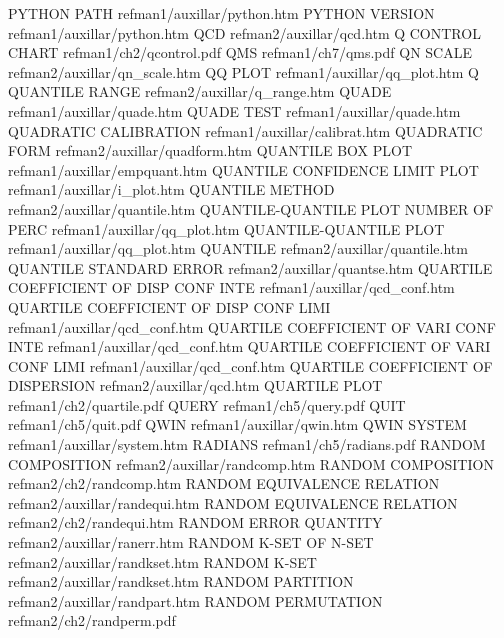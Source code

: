 PYTHON PATH                             refman1/auxillar/python.htm
PYTHON VERSION                          refman1/auxillar/python.htm
QCD                                     refman2/auxillar/qcd.htm
Q CONTROL CHART                         refman1/ch2/qcontrol.pdf
QMS                                     refman1/ch7/qms.pdf
QN SCALE                                refman2/auxillar/qn_scale.htm
QQ PLOT                                 refman1/auxillar/qq_plot.htm
Q QUANTILE RANGE                        refman2/auxillar/q_range.htm
QUADE                                   refman1/auxillar/quade.htm
QUADE TEST                              refman1/auxillar/quade.htm
QUADRATIC CALIBRATION                   refman1/auxillar/calibrat.htm
QUADRATIC FORM                          refman2/auxillar/quadform.htm
QUANTILE BOX PLOT                       refman1/auxillar/empquant.htm
QUANTILE CONFIDENCE LIMIT PLOT          refman1/auxillar/i_plot.htm
QUANTILE METHOD                         refman2/auxillar/quantile.htm
QUANTILE-QUANTILE PLOT NUMBER OF PERC   refman1/auxillar/qq_plot.htm
QUANTILE-QUANTILE PLOT                  refman1/auxillar/qq_plot.htm
QUANTILE                                refman2/auxillar/quantile.htm
QUANTILE STANDARD ERROR                 refman2/auxillar/quantse.htm
QUARTILE COEFFICIENT OF DISP CONF INTE  refman1/auxillar/qcd_conf.htm
QUARTILE COEFFICIENT OF DISP CONF LIMI  refman1/auxillar/qcd_conf.htm
QUARTILE COEFFICIENT OF VARI CONF INTE  refman1/auxillar/qcd_conf.htm
QUARTILE COEFFICIENT OF VARI CONF LIMI  refman1/auxillar/qcd_conf.htm
QUARTILE COEFFICIENT OF DISPERSION      refman2/auxillar/qcd.htm
QUARTILE PLOT                           refman1/ch2/quartile.pdf
QUERY                                   refman1/ch5/query.pdf
QUIT                                    refman1/ch5/quit.pdf
QWIN                                    refman1/auxillar/qwin.htm
QWIN SYSTEM                             refman1/auxillar/system.htm
RADIANS                                 refman1/ch5/radians.pdf
RANDOM COMPOSITION                      refman2/auxillar/randcomp.htm
RANDOM COMPOSITION                      refman2/ch2/randcomp.htm
RANDOM EQUIVALENCE RELATION             refman2/auxillar/randequi.htm
RANDOM EQUIVALENCE RELATION             refman2/ch2/randequi.htm
RANDOM ERROR QUANTITY                   refman2/auxillar/ranerr.htm
RANDOM K-SET OF N-SET                   refman2/auxillar/randkset.htm
RANDOM K-SET                            refman2/auxillar/randkset.htm
RANDOM PARTITION                        refman2/auxillar/randpart.htm
RANDOM PERMUTATION                      refman2/ch2/randperm.pdf
